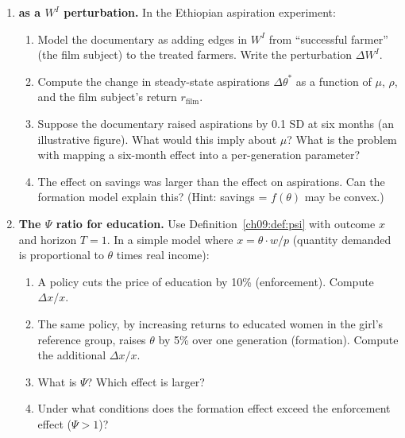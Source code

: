 \documentclass[../structural_economics_book.tex]{subfiles}
\begin{document}
\begin{enumerate}[label=\textbf{9.\arabic*}, leftmargin=3em]
\item \textbf{\citet{bernard2014future} as a $W^I$ perturbation.} In the Ethiopian aspiration experiment:
\begin{enumerate}
\item Model the documentary as adding edges in $W^I$ from ``successful farmer'' (the film subject) to the treated farmers. Write the perturbation $\Delta W^I$.
\item Compute the change in steady-state aspirations $\Delta\theta^*$ as a function of $\mu$, $\rho$, and the film subject's return $r_{\text{film}}$.
\item Suppose the documentary raised aspirations by 0.1 SD at six months (an illustrative figure). What would this imply about $\mu$? What is the problem with mapping a six-month effect into a per-generation parameter?
\item The effect on savings was larger than the effect on aspirations. Can the formation model explain this? (Hint: savings = $f(\theta)$ may be convex.)
\end{enumerate}

\item \textbf{The $\Psi$ ratio for education.} Use Definition~\ref{ch09:def:psi} with outcome $x$ and horizon $T = 1$. In a simple model where $x = \theta \cdot w / p$ (quantity demanded is proportional to $\theta$ times real income):
\begin{enumerate}
\item A policy cuts the price of education by 10\% (enforcement). Compute $\Delta x / x$.
\item The same policy, by increasing returns to educated women in the girl's reference group, raises $\theta$ by 5\% over one generation (formation). Compute the additional $\Delta x / x$.
\item What is $\Psi$? Which effect is larger?
\item Under what conditions does the formation effect exceed the enforcement effect ($\Psi > 1$)?
\end{enumerate}


\end{enumerate}
\end{document}
